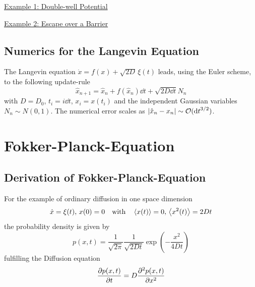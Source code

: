 \documentclass{/home/ben/Templates/notebook}
\begin{document}
	\underline{Example 1: Double-well Potential}
	
	\underline{Example 2: Escape over a Barrier}
	
	
	\subsection*{Numerics for the Langevin Equation}
	
	\begin{theorem}
		The Langevin equation $\dot{x} = f(x) + \sqrt{2D} \, \xi(t)$ leads, using the Euler scheme, to the following update-rule
		\begin{equation}
		\hat{x}_{n+1} = \hat{x}_n + f(\hat{x}_n) \dd{t} + \sqrt{2 D \dd{t}} N_n
		\end{equation}
		with $D = D_0$, $t_i = i \dd{t}$, $x_i = x(t_i)$ and the independent Gaussian variables $N_n \sim N(0,1)$. The numerical error scales as $|\hat{x}_n - x_n| \sim \mathcal{O}(\dd{t}^{3/2})$.
	\end{theorem}
	
	\section{Fokker-Planck-Equation}
	
	\subsection*{Derivation of Fokker-Planck-Equation}
	
	\begin{remark}
		
		For the example of ordinary diffusion in one space dimension
		\begin{equation}
		\dot{x} = \xi(t), \, x(0) = 0 \quad \mathrm{with} \quad \expval{x(t)} = 0, \, \expval{x^2(t)} = 2 D t
		\end{equation}
		the probability density is given by
		\begin{equation}
		p(x,t) = \frac{1}{\sqrt{2 \pi}} \frac{1}{\sqrt{2 D t}} \exp(-\frac{x^2}{4 D t})
		\end{equation}
		fulfilling the Diffusion equation
		\begin{equation}
		\pdv{p(x,t)}{t} = D \pdv[2]{p(x,t)}{x}
		\end{equation}
	\end{remark}
	
\end{document}
